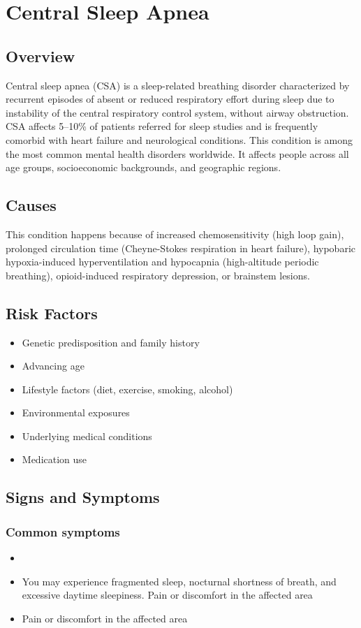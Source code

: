 \chapter{Central Sleep Apnea}
\label{sec:Central Sleep Apnea}

\section{Overview}
Central sleep apnea (CSA) is a sleep-related breathing disorder characterized by recurrent episodes of absent or reduced respiratory effort during sleep due to instability of the central respiratory control system, without airway obstruction. CSA affects 5--10\% of patients referred for sleep studies and is frequently comorbid with heart failure and neurological conditions. This condition is among the most common mental health disorders worldwide. It affects people across all age groups, socioeconomic backgrounds, and geographic regions.
\section{Causes}
This condition happens because of increased chemosensitivity (high loop gain), prolonged circulation time (Cheyne-Stokes respiration in heart failure), hypobaric hypoxia-induced hyperventilation and hypocapnia (high-altitude periodic breathing), opioid-induced respiratory depression, or brainstem lesions.     
\section{Risk Factors}

\begin{itemize}[noitemsep]
  \item Genetic predisposition and family history
  \item Advancing age
  \item Lifestyle factors (diet, exercise, smoking, alcohol)
  \item Environmental exposures
  \item Underlying medical conditions
  \item Medication use
\end{itemize}
\section{Signs and Symptoms}

\subsection{Common symptoms}
\begin{itemize}[noitemsep]
  \item \item You may experience fragmented sleep, nocturnal shortness of breath, and excessive daytime sleepiness. Pain or discomfort in the affected area    \item Pain or discomfort in the affected area
  \end{itemize}

